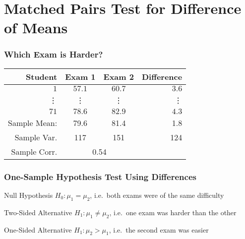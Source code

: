 \section{Matched Pairs Test for Difference of Means}
\begin{frame}
\frametitle{Which Exam is Harder?}
%
\begin{table}[!tbp]
\begin{center}
\begin{tabular}{rccr}
\hline\hline
\multicolumn{1}{r}{Student}&\multicolumn{1}{c}{Exam 1}&\multicolumn{1}{c}{Exam 2}&\multicolumn{1}{r}{Difference}\tabularnewline
\hline
$ 1$&$57.1$&$60.7$&$  3.6$\tabularnewline
\vdots&\vdots&\vdots&\vdots\\
$71$&$78.6$&$82.9$&$  4.3$\tabularnewline
\hline
Sample Mean: & 79.6 & 81.4  &1.8\\
Sample Var. &117  & 151 & 124\\
Sample Corr.& \multicolumn{2}{c}{0.54}&\\
\hline
\end{tabular}
\end{center}
\end{table}

\vspace{1em}

\end{frame}
\begin{frame}
\frametitle{One-Sample Hypothesis Test Using Differences}
\small
{}
\vspace{0.1em}
\begin{block}{Null Hypothesis}
$H_0\colon \mu_1 = \mu_2$, i.e.\ both exams were of the same difficulty
\end{block}
\begin{block}{Two-Sided Alternative}
$H_1\colon \mu_1 \neq \mu_2$, i.e.\ one exam was harder than the other
\end{block}
\begin{block}{One-Sided Alternative}
$H_1\colon \mu_2 > \mu_1$, i.e.\ the second exam was easier
\end{block}
\end{frame}

